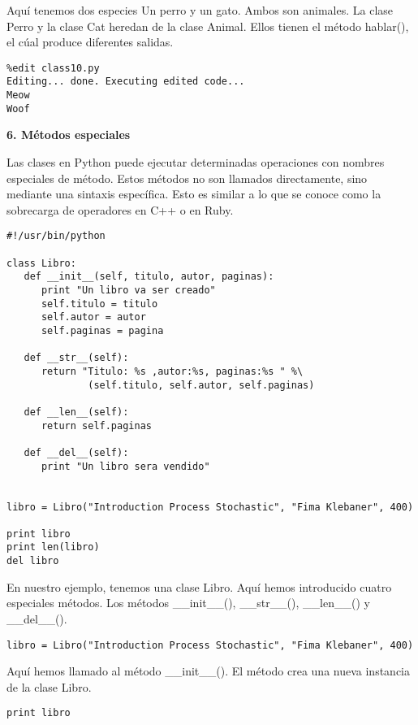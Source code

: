 \documentclass[twoside,10.5pt]{article}%
\begin{document}
Aqu\'i tenemos dos especies Un perro y un gato. Ambos son animales. La clase Perro y la clase Cat  heredan de la clase Animal. Ellos tienen el m\'etodo hablar(), el c\'ual produce diferentes salidas.

\begin{verbatim}
%edit class10.py
Editing... done. Executing edited code...
Meow
Woof
\end{verbatim}


\textbf{6. M\'etodos especiales}

Las clases en  Python puede ejecutar determinadas operaciones con nombres especiales de m\'etodo. Estos m\'etodos no son llamados directamente, sino mediante una sintaxis espec\'ifica. Esto es similar a lo que se conoce como la sobrecarga de operadores en C++ o en Ruby.


\begin{verbatim}
#!/usr/bin/python

class Libro:
   def __init__(self, titulo, autor, paginas):
      print "Un libro va ser creado"
      self.titulo = titulo
      self.autor = autor
      self.paginas = pagina

   def __str__(self):
      return "Titulo: %s ,autor:%s, paginas:%s " %\
              (self.titulo, self.autor, self.paginas)

   def __len__(self):
      return self.paginas

   def __del__(self):
      print "Un libro sera vendido"


libro = Libro("Introduction Process Stochastic", "Fima Klebaner", 400)

print libro
print len(libro)
del libro
\end{verbatim}


En nuestro ejemplo, tenemos una clase Libro. Aqu\'i hemos introducido cuatro especiales m\'etodos. Los
m\'etodos {\color{blue}\_\_init\_\_()}, {\color{blue}\_\_str\_\_()}, {\color{blue}\_\_len\_\_()} y {\color{blue}\_\_del\_\_()}.

\begin{verbatim}
libro = Libro("Introduction Process Stochastic", "Fima Klebaner", 400)
\end{verbatim}

Aqu\'i hemos llamado al m\'etodo {\color{blue}\_\_init\_\_()}. El m\'etodo crea una nueva instancia de la clase Libro.

\begin{verbatim}
print libro
\end{verbatim}
\end{document}
